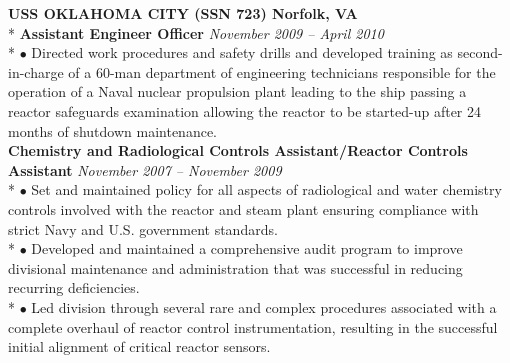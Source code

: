 \documentclass{article}
\begin{document}
\noindent \textbf{USS OKLAHOMA CITY (SSN 723) \hfill Norfolk, VA} \\*
\textbf{Assistant Engineer Officer} \hfill \textit{November 2009 -- April 2010} \\*
\noindent $\bullet$ Directed work procedures and safety drills and developed training as second-in-charge of a 60-man department of engineering technicians responsible for the operation of a Naval nuclear propulsion plant leading to the ship passing a reactor safeguards examination allowing the reactor to be started-up after 24 months of shutdown maintenance. \\
\noindent \textbf{Chemistry and Radiological Controls Assistant/Reactor Controls Assistant} \hfill \textit{November 2007 -- November 2009} \\*
$\bullet$ Set and maintained policy for all aspects of radiological and water chemistry controls involved with the reactor and steam plant ensuring compliance with strict Navy and U.S. government standards. \\*
$\bullet$ Developed and maintained a comprehensive audit program to improve divisional maintenance and administration that was successful in reducing recurring deficiencies. \\*
$\bullet$ Led division through several rare and complex procedures associated with a complete overhaul of reactor control instrumentation, resulting in the successful initial alignment of critical reactor sensors. \\
\end{document}
